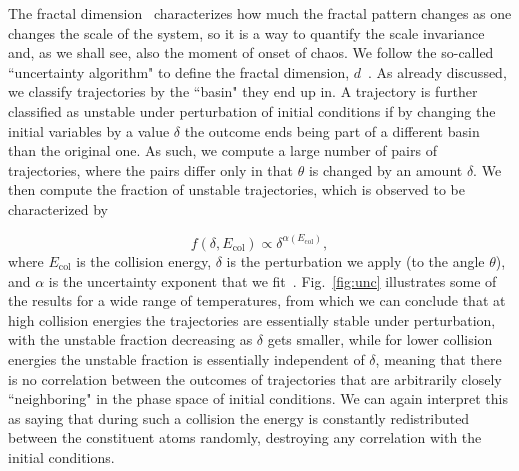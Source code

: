 \documentclass[%
 reprint,
 amsmath,amssymb,
 aps,
 nofootinbib
]{revtex4-1}
\begin{document}
The fractal dimension~\cite{mandelbrot1967} characterizes how much the fractal pattern changes as one changes the scale of the system, so it is a way to quantify the scale invariance and, as we shall see, also the moment of onset of chaos. We follow the so-called ``uncertainty algorithm" to define the fractal dimension, $d$~\cite{mcdonald1985}. As already discussed, we classify trajectories by the ``basin" they end up in. A trajectory is further classified as unstable under perturbation of initial conditions if by changing the initial variables by a value $\delta$ the outcome ends being part of a different basin than the original one. As such, we compute a large number of pairs of trajectories, where the pairs differ only in that $\theta$ is changed by an amount $\delta$. We then compute the fraction of unstable trajectories, which is observed to be characterized by

\begin{equation}
f(\delta, E_{\mathrm{col}}) \propto \delta^{\alpha(E_{\mathrm{col}})},
\end{equation}
where $E_{\mathrm{col}}$ is the collision energy, $\delta$ is the perturbation we apply (to the angle $\theta$), and $\alpha$ is the uncertainty exponent that we fit~\cite{mcdonald1985}. Fig.~\ref{fig:unc} illustrates some of the results for a wide range of temperatures, from which we can conclude that at high collision energies the trajectories are essentially stable under perturbation, with the unstable fraction decreasing as $\delta$ gets smaller, while for lower collision energies the unstable fraction is essentially independent of $\delta$, meaning that there is no correlation between the outcomes of trajectories that are arbitrarily closely ``neighboring" in the phase space of initial conditions. We can again interpret this as saying that during such a collision the energy is constantly redistributed between the constituent atoms randomly, destroying any correlation with the initial conditions.
\end{document}
